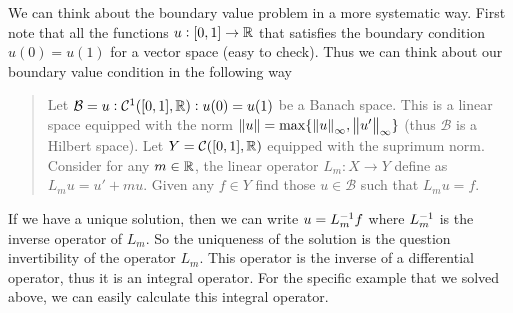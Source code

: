 We can think about the boundary value problem in a more systematic way. First note that all the functions $u:[0,1]\to\mathbb{R}$ that satisfies the boundary condition $u(0) = u(1)$ for a vector space (easy to check). Thus we can think about our boundary value condition in the following way
\begin{quote}
	Let $\mathcal{B} = {u:\mathcal{C}^1([0,1],\mathbb{R}): u(0) = u(1) }$ be a Banach space. This is a linear space equipped with the norm $\norm{u} = \max\{\norm{u}_\infty, \norm{u'}_\infty\}$ (thus $\mathcal{B}$ is a Hilbert space). Let $Y = \mathcal{C}([0,1],\mathbb{R})$ equipped with the suprimum norm. Consider for any $m\in \mathbb{R}$, the linear operator $L_m:X\to Y$ define as $L_mu =u'+mu$. Given any $f \in Y$ find those $u \in \mathcal{B}$ such that $L_m u = f.$
\end{quote}
If we have a unique solution, then we can write $u = L_m^{-1}f$ where $L_m^{-1}$ is the inverse operator of $L_m$. So the uniqueness of the solution is the question invertibility of the operator $L_m$. This operator is the inverse of a differential operator, thus it is an integral operator. For the specific example that we solved above, we can easily calculate this integral operator. 
